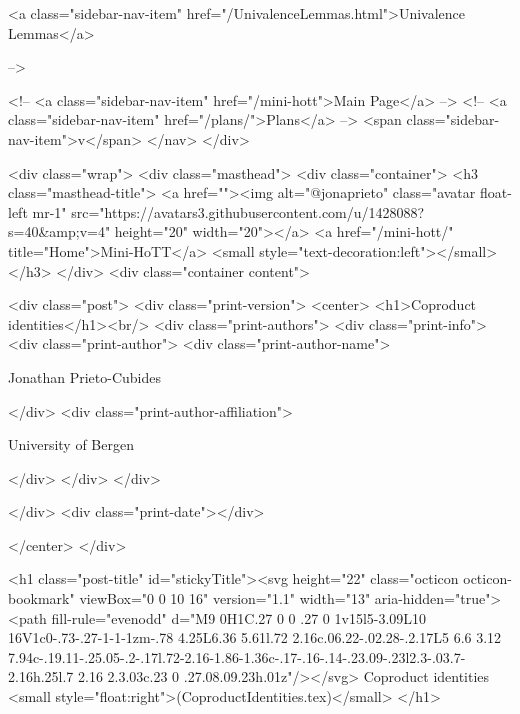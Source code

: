           <a class="sidebar-nav-item" href="/UnivalenceLemmas.html">Univalence Lemmas</a>
        
      
     -->

    <!-- <a class="sidebar-nav-item" href="/mini-hott">Main Page</a> -->
    <!-- <a class="sidebar-nav-item" href="/plans/">Plans</a> -->
    <span class="sidebar-nav-item">v</span>
  </nav>
</div>

    <div class="wrap">
      <div class="masthead">
        <div class="container">
          <h3 class="masthead-title">
            <a href=""><img alt="@jonaprieto" class="avatar float-left mr-1" src="https://avatars3.githubusercontent.com/u/1428088?s=40&amp;v=4" height="20" width="20"></a>
            <a href="/mini-hott/" title="Home">Mini-HoTT</a>
            <small style="text-decoration:left"></small>
          </h3>
        </div>
      <div class="container content">
        







<div class="post">
  <div class="print-version">
    <center>
      <h1>Coproduct identities</h1><br/>
        <div class="print-authors">
          <div class="print-info">
            <div class="print-author">
              <div class="print-author-name">
                
                  Jonathan Prieto-Cubides
                
              </div>
              <div class="print-author-affiliation">
                
                  University of Bergen
                
                </div>
            </div>
          </div>
          
          
        </div>
        <div class="print-date"></div>
        
        
    </center>
  </div>

  

  <h1 class="post-title" id="stickyTitle"><svg height="22" class="octicon octicon-bookmark" viewBox="0 0 10 16" version="1.1" width="13" aria-hidden="true"><path fill-rule="evenodd" d="M9 0H1C.27 0 0 .27 0 1v15l5-3.09L10 16V1c0-.73-.27-1-1-1zm-.78 4.25L6.36 5.61l.72 2.16c.06.22-.02.28-.2.17L5 6.6 3.12 7.94c-.19.11-.25.05-.2-.17l.72-2.16-1.86-1.36c-.17-.16-.14-.23.09-.23l2.3-.03.7-2.16h.25l.7 2.16 2.3.03c.23 0 .27.08.09.23h.01z"/></svg> Coproduct identities <small style="float:right">(CoproductIdentities.tex)</small>
  </h1>

